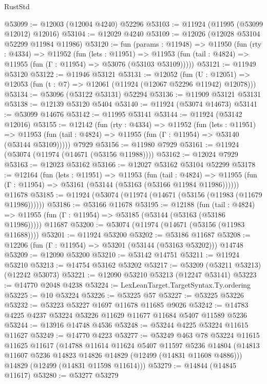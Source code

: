 \begin{lexlean}{RustStd}
\begin{coremodule}
{\begin{coremodule}
{{{{{{{{{{{{{{{{{{{{{{{{{{{{{{{{{{{{{{{{{{{{{{{{{{{{{{{{{{{{{{{{{{{{{{{{{{{{{{{{@53099 := @12003 (@12004 @4240) @52296
@53103 := @11924 (@11995 (@53099 @12012) @12016)
@53104 := @12029 @4240
@53109 := @12026 (@12028 @53104 @52299 @11984 @11986)
@53120 := fun (params : @11948) =>
  @11950
    (fun (rty : @4334) =>
    @11952
      (fun (lets : @11951) =>
      @11953 (fun (tail : @4824) => @11955 (fun (Γ : @11954) => @53076 (@53103 @53109)))))
@53121 := @11949 @53120
@53122 := @11946 @53121
@53131 := @12052
    (fun (U : @12051) => @12053 (fun (t : @7) => @12061 (@11924 (@12067 @52296 @11942) @12078)))
@53134 := @53096 (@53122 @53131) @52294
@53136 := @11909 @53121 @53131
@53138 := @12139 @53120 @5404
@53140 := @11924 (@53074 @14673)
@53141 := @53099 @14676
@53142 := @11995 @53141
@53144 := @11924 (@53142 @12016)
@53155 := @12142
    (fun (rty : @4334) =>
    @11952
      (fun (lets : @11951) =>
      @11953 (fun (tail : @4824) => @11955 (fun (Γ : @11954) => @53140 (@53144 @53109)))))
    @7929
@53156 := @11980 @7929
@53161 := @11924 (@53074 (@11974 (@14671 (@53156 @11988))))
@53162 := @12024 @7929
@53163 := @12023 @53162
@53166 := @12027 @53162 @53104 @52299
@53178 := @12164
    (fun (lets : @11951) =>
    @11953
      (fun (tail : @4824) =>
      @11955 (fun (Γ : @11954) => @53161 (@53144 (@53163 (@53166 @11984 @11986))))))
    @11678
@53185 := @11924 (@53074 (@11974 (@14671 (@53156 (@11983 (@11679 @11986))))))
@53186 := @53166 @11678
@53195 := @12188
    (fun (tail : @4824) => @11955 (fun (Γ : @11954) => @53185 (@53144 (@53163 (@53186 @11986)))))
    @11687
@53200 := @53074 (@11974 (@14671 (@53156 (@11983 @11688))))
@53201 := @11924 @53200
@53202 := @53186 @11687
@53208 := @12206 (fun (Γ : @11954) => @53201 (@53144 (@53163 @53202))) @14748
@53209 := @12090 @53200
@53210 := @53142 @14751
@53211 := @11924 @53210
@53213 := @14754 @53162 @53202
@53217 := @53209 (@53211 @53213) (@12242 @53073)
@53221 := @12090 @53210 @53213 (@12247 @53141)
@53223 := @14770 @2048 @4238
@53224 := LexLeanTarget.TargetSyntax.Ty.ordering
@53225 := @10 @53224
@53226 := @53225 @57
@53227 := @53225 @53226
@53232 := @53223 @53227 @1697 @11678 @11685 @9026
@53242 := @14783 @4225 @4237 @53224 @53226 @11629 @11677 @11684 @5407 @11589 @5236
@53244 := @13916 @14748 @4536
@53248 := @53244 @4225 @53224 @11615 @11627
@53249 := @14770 @4223
@53277 := @53249
    @463
    @78
    @53224
    @11615
    @11625
    @11617
    (@14788
      @11614
      @11624
      @5407
      @11597
      @5236
      @14804
      (@14813 @11607 @5236 @14823 @14826 @14829 (@12499 (@14831 @11608 @4886)))
      @14829
      (@12499 (@14831 @11598 @11614)))
@53279 := @14844 (@14845 @11617)
@53280 := @53277 @53279
}}}}}}}}}}}}}}}}}}}}}}}}}}}}}}}}}}}}}}}}}}}}}}}}}}}}}}}}}}}}}}}}}}}}}}}}}}}}}}}}
\end{coremodule}}
\end{coremodule}
\end{lexlean}
